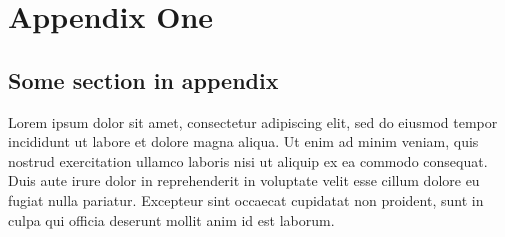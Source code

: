 \documentclass{article}
\begin{document}
\chapter{Appendix One}
\section{Some section in appendix}
Lorem ipsum dolor sit amet, consectetur adipiscing elit, sed do eiusmod tempor incididunt ut labore et dolore magna aliqua. Ut enim ad minim veniam, quis nostrud exercitation ullamco laboris nisi ut aliquip ex ea commodo consequat. Duis aute irure dolor in reprehenderit in voluptate velit esse cillum dolore eu fugiat nulla pariatur. Excepteur sint occaecat cupidatat non proident, sunt in culpa qui officia deserunt mollit anim id est laborum.
\end{document}

